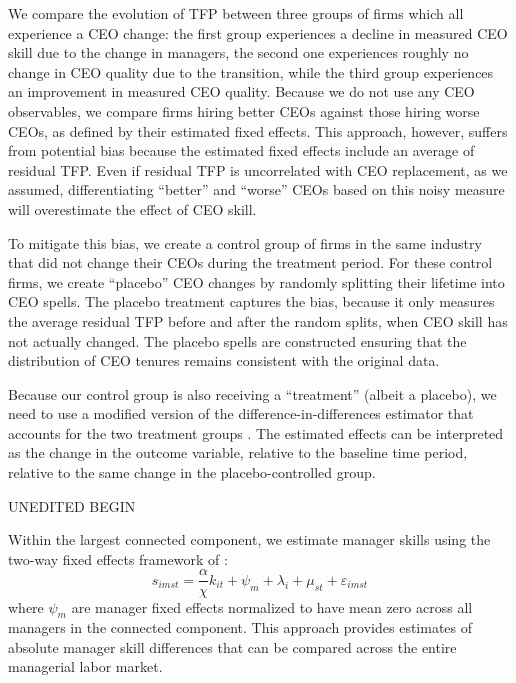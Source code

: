 \documentclass[11pt,a4paper]{article}
\begin{document}
We compare the evolution of TFP between three groups of firms which all experience a CEO change: the first group experiences a decline in  measured CEO skill due to the change in managers, the second one experiences roughly no change in CEO quality due to the transition, while the third group experiences an improvement in measured CEO quality. Because we do not use any CEO observables, we compare firms hiring better CEOs against those hiring worse CEOs, as defined by their estimated fixed effects. This approach, however, suffers from potential bias because the estimated fixed effects include an average of residual TFP. Even if residual TFP is uncorrelated with CEO replacement, as we assumed, differentiating ``better'' and ``worse'' CEOs based on this noisy measure will overestimate the effect of CEO skill.

To mitigate this bias, we create a control group of firms in the same industry that did not change their CEOs during the treatment period. For these control firms, we create ``placebo'' CEO changes by randomly splitting their lifetime into CEO spells. The placebo treatment captures the bias, because it only measures the average residual TFP before and after the random splits, when CEO skill has not actually changed.  The placebo spells are constructed ensuring that the distribution of CEO tenures remains consistent with the original data.

Because our control group is also receiving a ``treatment'' (albeit a placebo), we need to use a modified version of the difference-in-differences estimator \citep{Callaway2021JoLE} that accounts for the two treatment groups \citep{Koren2023expat,Koren2024xt2treatments}. The estimated effects can be interpreted as the change in the outcome variable, relative to the baseline time period, relative to the same change in the placebo-controlled group.

UNEDITED BEGIN

Within the largest connected component, we estimate manager skills using the two-way fixed effects framework of \citet{abowd1999high}:
\begin{equation}
s_{imst} = \frac{\alpha}{\chi} k_{it} + \psi_m + \lambda_i + \mu_{st} + \varepsilon_{imst}
\end{equation}
where $\psi_m$ are manager fixed effects normalized to have mean zero across all managers in the connected component. This approach provides estimates of absolute manager skill differences that can be compared across the entire managerial labor market.
\end{document}
